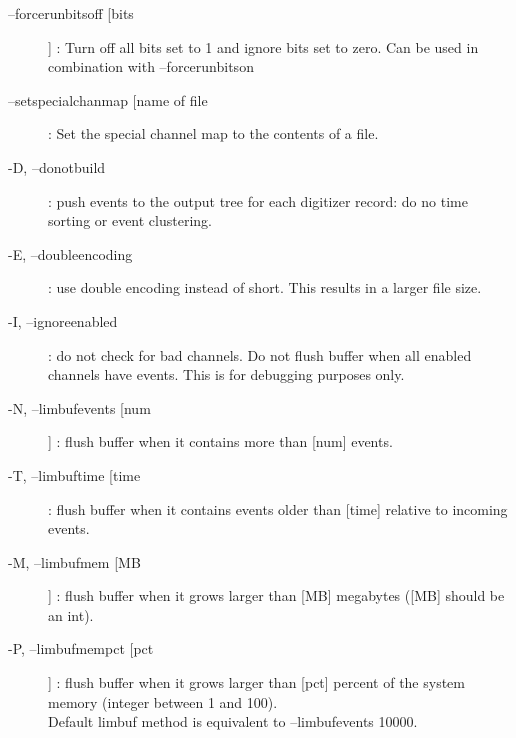 \documentclass[/main.tex]{subfiles}
\begin{document}
\begin{description}
  \item[--forcerunbitsoff [bits]] : Turn off all bits set to 1 and ignore bits set to zero. Can be used in combination with --forcerunbitson
  \item[--setspecialchanmap [name of file] : Set the special channel map to the contents of a file.
  \item[-D, --donotbuild] : push events to the output tree for each digitizer record: do no time sorting or event clustering. 
  \item[-E, --doubleencoding] : use double encoding instead of short. This results in a larger file size. 
  \item[-I, --ignoreenabled] : do not check for bad channels. Do not flush buffer when all enabled channels have events. This is for debugging purposes only.
  \item[-N, --limbufevents [num]] : flush buffer when it contains more than [num] events. 
  \item[-T, --limbuftime [time] : flush buffer when it contains events older than [time] relative to incoming events. 
  \item[-M, --limbufmem [MB]] : flush buffer when it grows larger than [MB] megabytes ([MB] should be an int). 
  \item[-P, --limbufmempct [pct]] : flush buffer when it grows larger than [pct] percent of the system memory (integer between 1 and 100). \\
    Default limbuf method is equivalent to --limbufevents 10000.
\end{description}
\end{document}
